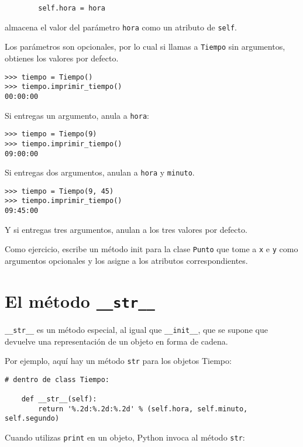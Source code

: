 \documentclass[10pt]{book}
\begin{document}
\begin{verbatim}
        self.hora = hora
\end{verbatim}
%
almacena el valor del parámetro {\tt hora} como un atributo
de {\tt self}.

Los parámetros son opcionales, por lo cual si llamas a {\tt Tiempo} sin
argumentos, obtienes los valores por defecto.

\begin{verbatim}
>>> tiempo = Tiempo()
>>> tiempo.imprimir_tiempo()
00:00:00
\end{verbatim}
%
Si entregas un argumento, anula a {\tt hora}:

\begin{verbatim}
>>> tiempo = Tiempo(9)
>>> tiempo.imprimir_tiempo()
09:00:00
\end{verbatim}
%
Si entregas dos argumentos, anulan a {\tt hora} y
{\tt minuto}.

\begin{verbatim}
>>> tiempo = Tiempo(9, 45)
>>> tiempo.imprimir_tiempo()
09:45:00
\end{verbatim}
%
Y si entregas tres argumentos, anulan a los tres
valores por defecto.

Como ejercicio, escribe un método init para la clase {\tt Punto} que tome a
{\tt x} e {\tt y} como argumentos opcionales y los asigne
a los atributos correspondientes.


\section{El método {\tt \_\_str\_\_}}

\verb"__str__" es un método especial, al igual que \verb"__init__",
que se supone que devuelve una representación de un objeto en forma de cadena.

Por ejemplo, aquí hay un método {\tt str} para los objetos Tiempo:

\begin{verbatim}
# dentro de class Tiempo:

    def __str__(self):
        return '%.2d:%.2d:%.2d' % (self.hora, self.minuto, self.segundo)
\end{verbatim}
%
Cuando utilizas {\tt print} en un objeto, Python invoca al método {\tt str}:
\end{document}

